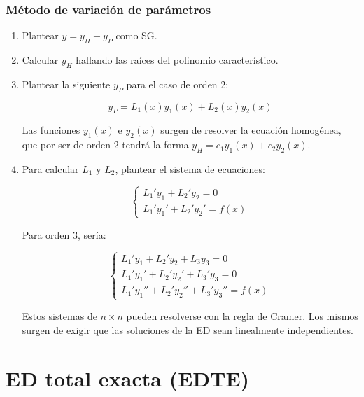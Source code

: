\documentclass{article}
\begin{document}
\subsubsection{Método de variación de parámetros}

\begin{enumerate}
\item Plantear $y = y_H + y_P$ como SG.
\item Calcular $y_H$ hallando las raíces del polinomio característico.
\item Plantear la siguiente $y_P$ para el caso de orden 2:

\begin{equation}
y_P = L_1(x) y_1(x) + L_2(x) y_2(x)
\end{equation}

Las funciones $y_1(x)$ e $y_2(x)$ surgen de resolver la ecuación homogénea, que por ser de orden 2 tendrá la forma $y_H = c_1 y_1(x) + c_2 y_2(x)$. 

\item Para calcular $L_1$ y $L_2$, plantear el sistema de ecuaciones:

\begin{equation}
\left\{
\begin{array}{ll}
L_1' y_1 + L_2' y_2 = 0 \\
L_1' y_1' + L_2' y_2' = f(x)
\end{array}
\right.
\end{equation}

Para orden 3, sería:

\begin{equation}
\left\{
\begin{array}{ll}
L_1' y_1 + L_2' y_2 + L_3 y_3 = 0 \\
L_1' y_1' + L_2' y_2' + L_3' y_3 = 0 \\
L_1' y_1'' + L_2' y_2'' + L_3' y_3'' = f(x)
\end{array}
\right.
\end{equation}

Estos sistemas de $n \times n$ pueden resolverse con la regla de Cramer. Los mismos surgen de exigir que las soluciones de la ED sean linealmente independientes.

\end{enumerate}

\newpage

\section{ED total exacta (EDTE)}
\end{document}
